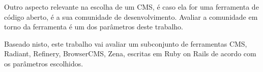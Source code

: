 
Outro aspecto relevante na escolha de um CMS, é caso ela for uma ferramenta de código aberto, é a sua comunidade de desenvolvimento. Avaliar a comunidade em torno da ferramenta é um dos parâmetros deste trabalho.







Baseado nisto, este trabalho vai avaliar um subconjunto de ferramentas CMS, Radiant, Refinery, BrowserCMS, Zena, escritas em Ruby on Rails de acordo com os parâmetros escolhidos.
